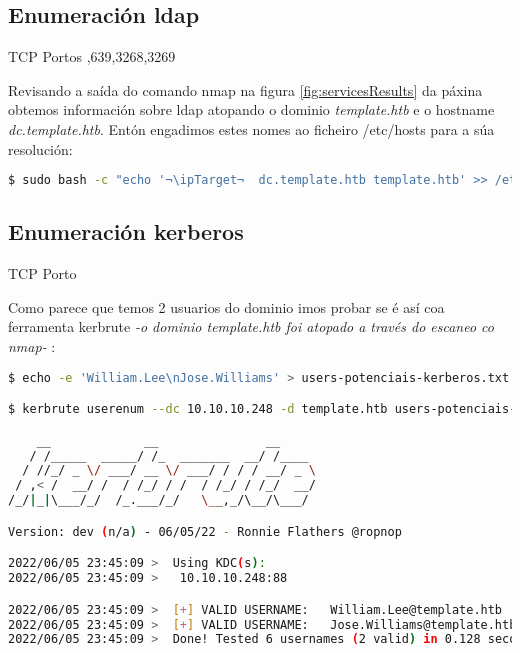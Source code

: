 \documentclass[a4paper]{article}
\newcommand{\ipTarget}{10.10.10.248}
\begin{document}
        \subsection{Enumeración ldap}
        \vspace{0.2cm}

        \begin{schema}{TCP}
        Portos
        ,639,3268,3269
        \end{schema}
 Revisando a saída do comando nmap na figura \ref{fig:servicesResults} da páxina \pageref{fig:servicesResults} obtemos información sobre ldap atopando o dominio \textit{template.htb} e o hostname \textit{dc.template.htb}. Entón engadimos estes nomes ao ficheiro /etc/hosts para a súa resolución:
        \begin{lstlisting}[language=Bash, caption=Resolución DNS: /etc/hosts]
$ sudo bash -c "echo '¬\ipTarget¬  dc.template.htb template.htb' >> /etc/hosts"\end{lstlisting}

        \subsection{Enumeración kerberos}
        \vspace{0.2cm}

        \begin{schema}{TCP}
        Porto
        \end{schema}
 
        Como parece que temos 2 usuarios do dominio imos probar se é así coa ferramenta kerbrute \textit{-o dominio template.htb foi atopado a través do escaneo co nmap-} :

        \begin{lstlisting}[language=Bash, caption=Enumeración usuarios kerberos: kerbrute]
$ echo -e 'William.Lee\nJose.Williams' > users-potenciais-kerberos.txt

$ kerbrute userenum --dc 10.10.10.248 -d template.htb users-potenciais-kerberos.txt

    __             __               __     
   / /_____  _____/ /_  _______  __/ /____ 
  / //_/ _ \/ ___/ __ \/ ___/ / / / __/ _ \
 / ,< /  __/ /  / /_/ / /  / /_/ / /_/  __/
/_/|_|\___/_/  /_.___/_/   \__,_/\__/\___/                                        

Version: dev (n/a) - 06/05/22 - Ronnie Flathers @ropnop

2022/06/05 23:45:09 >  Using KDC(s):
2022/06/05 23:45:09 >  	10.10.10.248:88

2022/06/05 23:45:09 >  [+] VALID USERNAME:	 William.Lee@template.htb
2022/06/05 23:45:09 >  [+] VALID USERNAME:	 Jose.Williams@template.htb
2022/06/05 23:45:09 >  Done! Tested 6 usernames (2 valid) in 0.128 seconds

\end{lstlisting}
\end{document}
